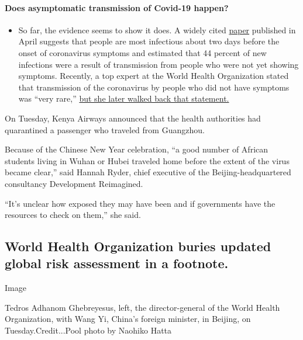 \begin{itemize}
{  \paragraph{Does asymptomatic transmission of Covid-19
  happen?}\label{does-asymptomatic-transmission-of-covid-19-happen}}

  \begin{itemize}
  \tightlist
  \item
    So far, the evidence seems to show it does. A widely cited
    \href{https://www.nature.com/articles/s41591-020-0869-5}{paper}
    published in April suggests that people are most infectious about
    two days before the onset of coronavirus symptoms and estimated that
    44 percent of new infections were a result of transmission from
    people who were not yet showing symptoms. Recently, a top expert at
    the World Health Organization stated that transmission of the
    coronavirus by people who did not have symptoms was ``very rare,''
    \href{https://www.nytimes.com/2020/06/09/world/coronavirus-updates.html?action=click\&pgtype=Article\&state=default\&region=MAIN_CONTENT_3\&context=storylines_faq\#link-1f302e21}{but
    she later walked back that statement.}
  \end{itemize}
\end{itemize}

On Tuesday, Kenya Airways announced that the health authorities had
quarantined a passenger who traveled from Guangzhou.

Because of the Chinese New Year celebration, ``a good number of African
students living in Wuhan or Hubei traveled home before the extent of the
virus became clear,'' said Hannah Ryder, chief executive of the
Beijing-headquartered consultancy Development Reimagined.

``It's unclear how exposed they may have been and if governments have
the resources to check on them,'' she said.

\hypertarget{world-health-organization-buries-updated-global-risk-assessment-in-a-footnote}{%
\subsection{World Health Organization buries updated global risk
assessment in a
footnote.}\label{world-health-organization-buries-updated-global-risk-assessment-in-a-footnote}}

Image

Tedros Adhanom Ghebreyesus, left, the director-general of the World
Health Organization, with Wang Yi, China's foreign minister, in Beijing,
on Tuesday.Credit...Pool photo by Naohiko Hatta

